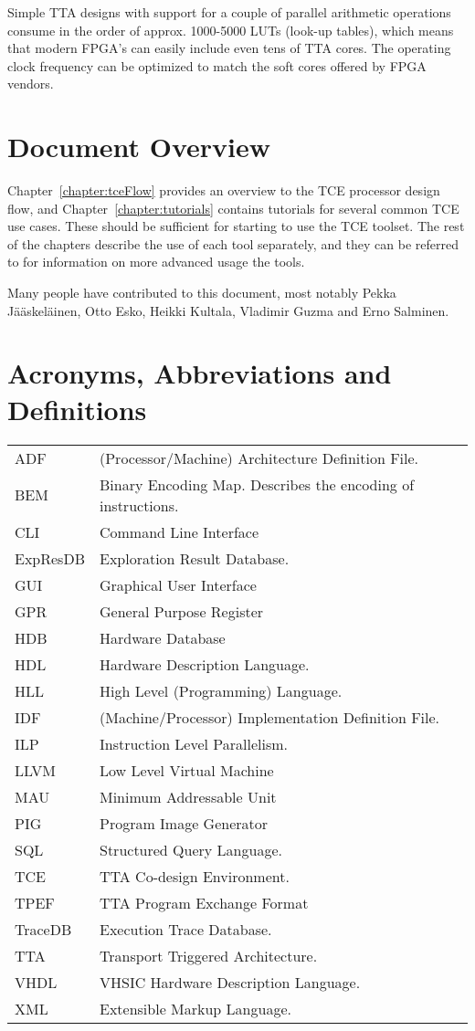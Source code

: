 \documentclass[twoside]{tceusermanual}
\begin{document}
Simple TTA designs with support for a couple of
parallel arithmetic operations consume in the order of
approx. 1000-5000 LUTs (look-up tables), which means that modern FPGA's
can easily include even tens of TTA cores. The operating clock frequency can
be optimized to match the soft cores offered by FPGA vendors.

\section{Document Overview}

Chapter~\ref{chapter:tceFlow} provides an overview to the TCE
processor design flow, and Chapter~\ref{chapter:tutorials} contains
tutorials for several common TCE use cases. These should be sufficient
for starting to use the TCE toolset.  The rest of the chapters
describe the use of each tool separately, and they can be referred to
for information on more advanced usage the tools.

Many people have contributed to this document, most notably Pekka
Jääskeläinen, Otto Esko, Heikki Kultala, Vladimir Guzma and Erno
Salminen.


\section{Acronyms, Abbreviations and Definitions}
\begin{tabular}[h]{p{}p{}}
ADF & (Processor/Machine) Architecture Definition File.\\
BEM & Binary Encoding Map. Describes the encoding of instructions.\\
CLI & Command Line Interface\\
ExpResDB  & Exploration Result Database.\\
GUI & Graphical User Interface \\
GPR & General Purpose Register \\
HDB & Hardware Database \\
HDL & Hardware Description Language. \\
HLL & High Level (Programming) Language. \\
IDF & (Machine/Processor) Implementation Definition File.\\
ILP & Instruction Level Parallelism.\\
LLVM & Low Level Virtual Machine \\
MAU & Minimum Addressable Unit\\
PIG & Program Image Generator\\
SQL & Structured Query Language.\\
TCE & TTA Co-design Environment.\\
TPEF & TTA Program Exchange Format \\
TraceDB & Execution Trace Database. \\
TTA & Transport Triggered Architecture.\\
VHDL & VHSIC Hardware Description Language. \\
XML & Extensible Markup Language. \\
\end{tabular}
\end{document}
